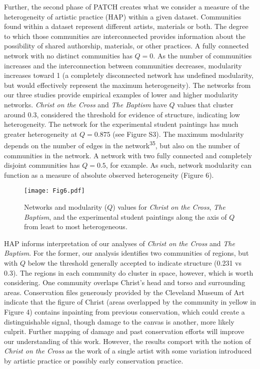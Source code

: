 \documentclass[11pt]{article}
\begin{document}
Further, the second phase of PATCH creates what we consider a measure of
the heterogeneity of artistic practice (HAP) within a given dataset. Communities found within a dataset
represent different artists, materials or both. The degree to which
those communities are interconnected provides information about the
possibility of shared authorship, materials, or other practices. A fully
connected network with no distinct communities has $Q = 0$. As the number
of communities increases and the interconnection between communities
decreases, modularity increases toward 1 (a completely disconnected
network has undefined modularity, but would effectively represent the
maximum heterogeneity). The networks from our three studies provide
empirical examples of lower and higher modularity networks. \emph{Christ
on the Cross} and \emph{The Baptism} have $Q$ values that cluster around
0.3, considered the threshold for evidence of structure, indicating low
heterogeneity. The network for the experimental student paintings has
much greater heterogeneity at $Q=0.875$ (see Figure S3). The
maximum modularity depends on the number of edges in the network\textsuperscript{35}, but also on the number of communities in the
network. A network with two fully connected and completely disjoint
communities has $Q = 0.5$, for example. As such, network modularity can
function as a measure of absolute observed heterogeneity (Figure 6).

\begin{figure}
\centering
\texttt{[image: Fig6.pdf]}
\caption{Networks and modularity ($Q$) values for {\em Christ on the Cross}, {\em The Baptism}, and the experimental student paintings along the axis of $Q$ from
least to most heterogeneous.}
\end{figure}

HAP informs interpretation of our analyses of \emph{Christ on the Cross}
and \emph{The Baptism}. For the former, our analysis identifies two
communities of regions, but with $Q$ below the threshold generally
accepted to indicate structure (0.231 vs 0.3). The regions in each
community do cluster in space, however, which is worth considering. One
community overlaps Christ's head and torso and surrounding areas.
Conservation files generously provided by the Cleveland Museum of Art
indicate that the figure of Christ (areas overlapped by the community in
yellow in Figure 4) contains inpainting from previous conservation,
which could create a distinguishable signal, though damage to the canvas
is another, more likely culprit. Further mapping of damage and past
conservation efforts will improve our understanding of this work.
However, the results comport with the notion of \emph{Christ on the
Cross} as the work of a single artist with some variation introduced by
artistic practice or possibly early conservation practice.
\end{document}

